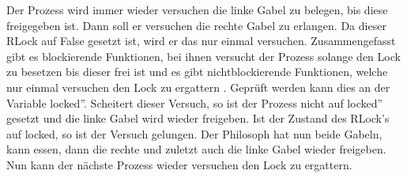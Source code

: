 Der Prozess wird immer wieder versuchen die linke Gabel zu belegen, bis diese freigegeben ist. Dann soll er versuchen die rechte Gabel zu erlangen. Da dieser RLock auf False gesetzt ist, wird er das nur einmal versuchen\parencite[vgl. ]{lock}. Zusammengefasst gibt es blockierende Funktionen, bei ihnen versucht der Prozess solange den Lock zu besetzen bis dieser frei ist und es gibt nichtblockierende Funktionen, welche nur einmal versuchen den Lock zu ergattern \parencite [vgl.][S.164]{sturm2001}. Geprüft werden kann dies an der Variable \glqq locked''. Scheitert dieser Versuch, so ist der Prozess nicht auf \glqq locked'' gesetzt und die linke Gabel wird wieder freigeben. Ist der Zustand des RLock's auf locked, so ist der Versuch gelungen.  Der Philosoph hat nun beide Gabeln, kann essen, dann die rechte und zuletzt auch die linke Gabel wieder freigeben. Nun kann der nächste Prozess wieder versuchen den Lock zu ergattern.
 







